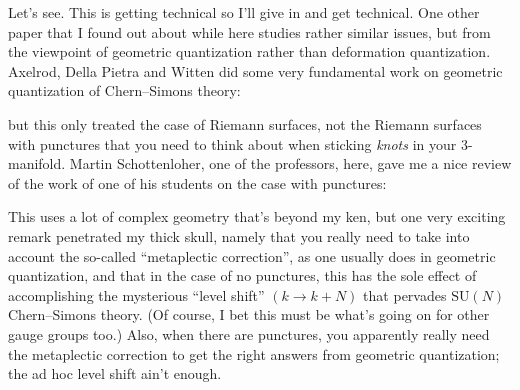 \documentclass{article}
\def\tightlist{}
\renewcommand{\texttt}[1]{%
  \begingroup
  \ttfamily
  \begingroup\lccode`~=`/\lowercase{\endgroup\def~}{/\discretionary{}{}{}}%
  \begingroup\lccode`~=`[\lowercase{\endgroup\def~}{[\discretionary{}{}{}}%
  \begingroup\lccode`~=`.\lowercase{\endgroup\def~}{.\discretionary{}{}{}}%
  \catcode`/=\active\catcode`[=\active\catcode`.=\active
  \scantokens{#1\noexpand}%
  \endgroup
}
\begin{document}
Let's see. This is getting technical so I'll give in and get technical.
One other paper that I found out about while here studies rather similar
issues, but from the viewpoint of geometric quantization rather than
deformation quantization. Axelrod, Della Pietra and Witten did some very
fundamental work on geometric quantization of Chern--Simons theory:

\noindent
but this only treated the case of Riemann surfaces, not the Riemann
surfaces with punctures that you need to think about when sticking
\emph{knots} in your 3-manifold. Martin Schottenloher, one of the
professors, here, gave me a nice review of the work of one of his
students on the case with punctures:

\noindent
This uses a lot of complex geometry that's beyond my ken, but one very
exciting remark penetrated my thick skull, namely that you really need
to take into account the so-called ``metaplectic correction'', as one
usually does in geometric quantization, and that in the case of no
punctures, this has the sole effect of accomplishing the mysterious
``level shift'' \((k \to k + N)\) that pervades \(\mathrm{SU}(N)\)
Chern--Simons theory. (Of course, I bet this must be what's going on for
other gauge groups too.) Also, when there are punctures, you apparently
really need the metaplectic correction to get the right answers from
geometric quantization; the ad hoc level shift ain't enough.
\end{document}
